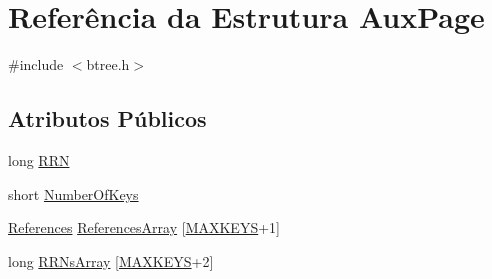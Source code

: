 \hypertarget{structAuxPage}{\section{Referência da Estrutura Aux\-Page}
\label{structAuxPage}
}


{\ttfamily \#include $<$btree.\-h$>$}

\subsection*{Atributos Públicos}
\begin{DoxyCompactItemize}
\item 
long \hyperlink{structAuxPage_a01fea01ef3c426f72cc6ebf975edc422}{R\-R\-N}
\item 
short \hyperlink{structAuxPage_ac9f519148aaa753921e25d01c6bc0e80}{Number\-Of\-Keys}
\item 
\hyperlink{structReferences}{References} \hyperlink{structAuxPage_a4c8858a412fbbc13c243b534ed5df578}{References\-Array} \mbox{[}\hyperlink{btree_8h_af887e874f95feb203c6504bc3e0d5c94}{M\-A\-X\-K\-E\-Y\-S}+1\mbox{]}
\item 
long \hyperlink{structAuxPage_adaaea5853a03f800b065b19c95d49717}{R\-R\-Ns\-Array} \mbox{[}\hyperlink{btree_8h_af887e874f95feb203c6504bc3e0d5c94}{M\-A\-X\-K\-E\-Y\-S}+2\mbox{]}
\end{DoxyCompactItemize}


